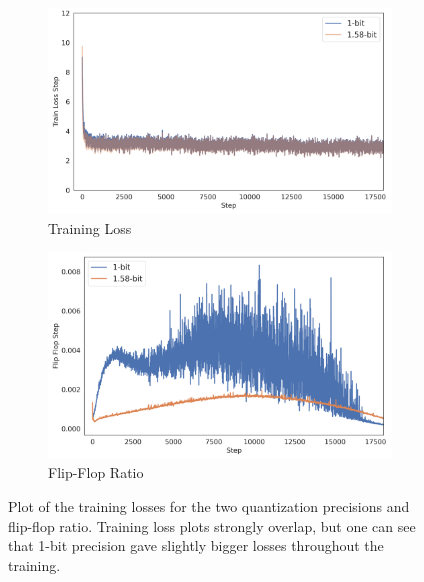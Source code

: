\documentclass{article}
\begin{document}
\begin{figure}[ht]
  \centering
  \begin{subfigure}[b]{0.45\textwidth}
    \includegraphics[width=\linewidth]{../data/plots/quant_precision.png}
    \caption{Training Loss}
  \end{subfigure}
  \hfill
  \begin{subfigure}[b]{0.45\textwidth}
    \includegraphics[width=\linewidth]{../data/plots/quant_precision_ff.png}
    \caption{Flip-Flop Ratio}
  \end{subfigure}
  \caption{Plot of the training losses for the two quantization precisions and flip-flop ratio. Training loss plots strongly overlap, but one can see that 1-bit precision gave slightly bigger losses throughout the training.}
  \label{fig:quant}
\end{figure}
\end{document}
